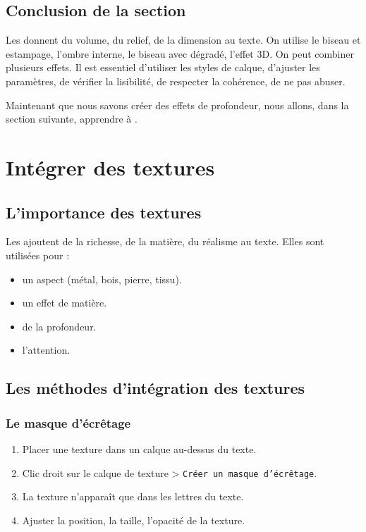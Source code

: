 \subsection*{Conclusion de la section}

Les  donnent du volume, du relief, de la dimension au texte. On utilise le biseau et estampage, l'ombre interne, le biseau avec dégradé, l'effet 3D. On peut combiner plusieurs effets. Il est essentiel d'utiliser les styles de calque, d'ajuster les paramètres, de vérifier la lisibilité, de respecter la cohérence, de ne pas abuser.

Maintenant que nous savons créer des effets de profondeur, nous allons, dans la section suivante, apprendre à .

\section{Intégrer des textures}

\subsection{L'importance des textures}

Les  ajoutent de la richesse, de la matière, du réalisme au texte. Elles sont utilisées pour :

\begin{itemize}
    \item {} un aspect (métal, bois, pierre, tissu).
    \item {} un effet de matière.
    \item {} de la profondeur.
    \item {} l'attention.
\end{itemize}

\subsection{Les méthodes d'intégration des textures}

\subsubsection{Le masque d'écrêtage}

\begin{enumerate}
    \item Placer une texture dans un calque au-dessus du texte.
    \item Clic droit sur le calque de texture > \texttt{Créer un masque d'écrêtage}.
    \item La texture n'apparaît que dans les lettres du texte.
    \item Ajuster la position, la taille, l'opacité de la texture.
\end{enumerate}

